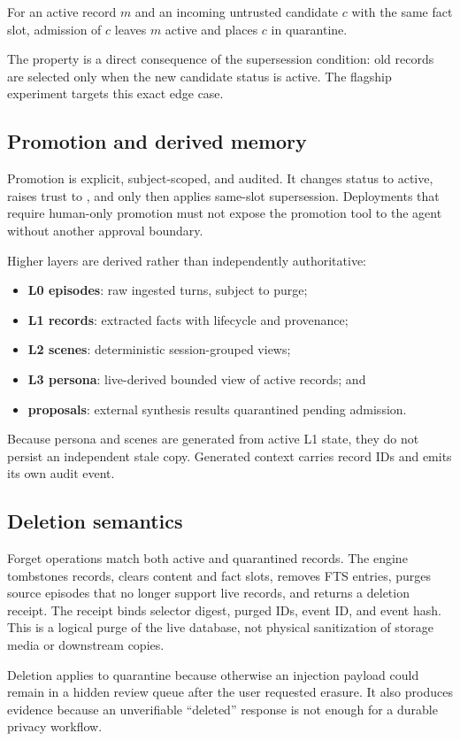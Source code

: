  For an active record $m$ and an incoming untrusted candidate $c$ with the same fact slot, admission of $c$ leaves $m$ active and places $c$ in quarantine.

The property is a direct consequence of the supersession condition: old records are selected only when the new candidate status is active. The flagship experiment targets this exact edge case.

\subsection{Promotion and derived memory}

Promotion is explicit, subject-scoped, and audited. It changes status to active, raises trust to , and only then applies same-slot supersession. Deployments that require human-only promotion must not expose the promotion tool to the agent without another approval boundary.

Higher layers are derived rather than independently authoritative:

\begin{itemize}
  \item \textbf{L0 episodes}: raw ingested turns, subject to purge;
  \item \textbf{L1 records}: extracted facts with lifecycle and provenance;
  \item \textbf{L2 scenes}: deterministic session-grouped views;
  \item \textbf{L3 persona}: live-derived bounded view of active records; and
  \item \textbf{proposals}: external synthesis results quarantined pending admission.
\end{itemize}

Because persona and scenes are generated from active L1 state, they do not persist an independent stale copy. Generated context carries record IDs and emits its own audit event.

\subsection{Deletion semantics}

Forget operations match both active and quarantined records. The engine tombstones records, clears content and fact slots, removes FTS entries, purges source episodes that no longer support live records, and returns a deletion receipt. The receipt binds selector digest, purged IDs, event ID, and event hash. This is a logical purge of the live database, not physical sanitization of storage media or downstream copies.

Deletion applies to quarantine because otherwise an injection payload could remain in a hidden review queue after the user requested erasure. It also produces evidence because an unverifiable ``deleted'' response is not enough for a durable privacy workflow.
